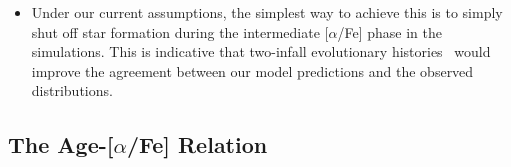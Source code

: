 \documentclass[fleqn, usenatbib]{mnras}
\begin{document}
\begin{itemize}
\begin{itemize}
		\item Under our current assumptions, the simplest way to achieve this 
		is to simply shut off star formation during the intermediate 
		[$\alpha$/Fe] phase in the simulations. This is indicative that 
		two-infall evolutionary histories~\citep[e.g.][]{Chiappini1997, 
		Chiappini2001, Romano2010, Grisoni2017, Noguchi2018, Spitoni2016, 
		Spitoni2018, Spitoni2019, Spitoni2020, Spitoni2021} would improve the 
		agreement between our model predictions and the observed 
		distributions. 
	\end{itemize} 

\end{itemize} 


\subsection{The Age-[$\alpha$/Fe] Relation} 
\label{sec:comp_obs:age_alpha} 
\end{document}
